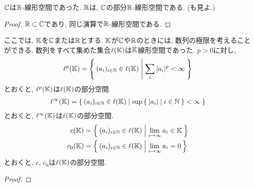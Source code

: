 \begin{example}
  \label{subsp:example:cc}
  $\mathbb{C}$は$\mathbb{R}$-線形空間であった.
  $\mathbb{R}$は, $\mathbb{C}$の部分$\mathbb{R}$-線形空間である.
  (も見よ.)
\end{example}
\begin{proof}
$\mathbb{R}\subset\mathbb{C}$であり, 同じ演算で$\mathbb{R}$-線形空間である.
\end{proof}


\begin{example}
  ここでは,
  $\mathbb{K}$を$\mathbb{C}$または$\mathbb{R}$とする.
  $\mathbb{K}$が$\mathbb{C}$や$\mathbb{R}$のときには,
  数列の極限を考えることができる.  
  数列をすべて集めた集合$\ell(\mathbb{K})$は$\mathbb{K}$線形空間であった.
  $p>0$に対し,
  \begin{align*}
    \ell^p(\mathbb{K})=\Set{(a_i)_{i\in\mathbb{N}}\in \ell(\mathbb{K})|\sum_i |a_i|^p < \infty}
  \end{align*}
  とおくと, $\ell^p(\mathbb{K})$は$\ell(\mathbb{K})$の部分空間.
  \begin{align*}
    \ell^\infty(\mathbb{K})=\Set{(a_i)_{i\in\mathbb{N}}\in \ell(\mathbb{K})|\sup \Set{\left|a_i\right||i\in \mathbb{N}} < \infty}
  \end{align*}
  とおくと, $\ell^\infty(\mathbb{K})$は$\ell(\mathbb{K})$の部分空間.
  \begin{align*}
    c(\mathbb{K})&=\Set{(a_i)_{i\in\mathbb{N}} \in \ell(\mathbb{K})| \lim_{i\to\infty} a_i \in\mathbb{K}}\\
    c_0(\mathbb{K})&=\Set{(a_i)_{i\in\mathbb{N}} \in \ell(\mathbb{K})| \lim_{i\to\infty} a_i =0}\\
  \end{align*}
  とおくと, $c$, $c_0$は$\ell(\mathbb{K})$の部分空間.
\end{example}
\begin{proof}\end{proof}

